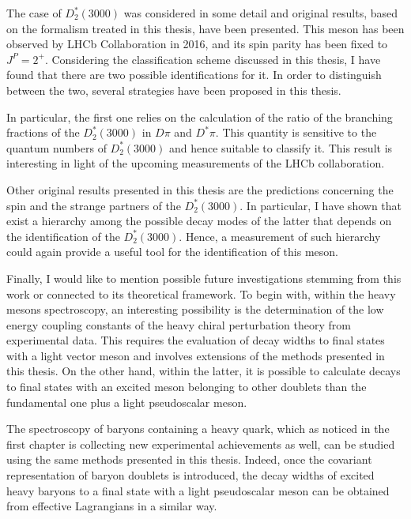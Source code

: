 The case of $D^*_2(3000)$ was considered in some detail and original results, based on the formalism treated in this thesis, have been presented. This meson has been observed by LHCb Collaboration in 2016, and its spin parity has been fixed to $J^P=2^+$. Considering  the classification scheme discussed in this thesis, I have found that there are  two possible identifications for it. In order to distinguish between the two, several strategies have been proposed in this thesis. 

In particular, the first one relies on the calculation of the ratio of the branching fractions of the $D^*_2(3000)$ in $D \pi$ and $D^* \pi$. This quantity is sensitive to the quantum numbers of $D^*_2(3000)$ and hence suitable to classify it. This result is interesting in light of the upcoming measurements of the LHCb collaboration.

Other original results presented in this thesis are the predictions concerning the spin and the strange partners of the $D^*_2(3000)$. In particular, I have shown that exist a hierarchy among the possible decay modes of the latter that depends on the identification of the $D^*_2(3000)$. Hence, a measurement of such hierarchy could again provide a useful tool for the identification of this meson.

Finally, I would like to mention possible future investigations stemming from this work or connected to its theoretical framework. To begin with, within the heavy mesons spectroscopy, an interesting possibility is the determination of the low energy coupling constants of the heavy chiral perturbation theory from experimental data. This requires the evaluation of decay widths to final states with a light vector meson and involves extensions of the methods presented in this thesis. On the other hand, within the latter, it is possible to calculate decays to final states with an excited meson belonging to other doublets than the fundamental one plus a light pseudoscalar meson.

The spectroscopy of baryons containing a heavy quark, which as noticed in the first chapter is collecting new experimental achievements as well, can be studied using the same methods presented in this thesis. Indeed, once the covariant representation of baryon doublets is introduced, the decay widths of excited heavy baryons to a final state with a light pseudoscalar meson can be obtained from effective Lagrangians in a similar way.

